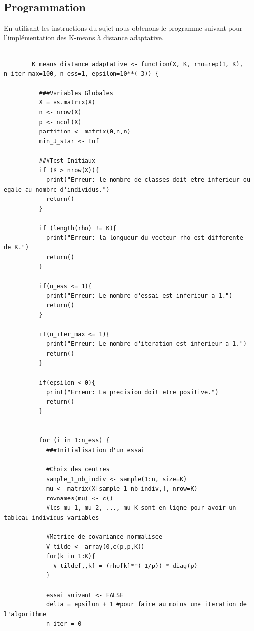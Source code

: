 \documentclass[a4paper,11pt,oneside,roman]{article}
\begin{document}
    \subsection{Programmation}
    En utilisant les instructions du sujet nous obtenons le programme suivant pour l'implémentation des K-means à distance adaptative.
    \begin{lstlisting}

        K_means_distance_adaptative <- function(X, K, rho=rep(1, K), n_iter_max=100, n_ess=1, epsilon=10**(-3)) {
          
          ###Variables Globales
          X = as.matrix(X)
          n <- nrow(X)
          p <- ncol(X)
          partition <- matrix(0,n,n)
          min_J_star <- Inf
          
          ###Test Initiaux
          if (K > nrow(X)){
            print("Erreur: le nombre de classes doit etre inferieur ou egale au nombre d'individus.")
            return()
          }
        
          if (length(rho) != K){
            print("Erreur: la longueur du vecteur rho est differente de K.")
            return()
          }
          
          if(n_ess <= 1){
            print("Erreur: Le nombre d'essai est inferieur a 1.")
            return()
          }
          
          if(n_iter_max <= 1){
            print("Erreur: Le nombre d'iteration est inferieur a 1.")
            return()
          }
          
          if(epsilon < 0){
            print("Erreur: La precision doit etre positive.")
            return()
          }
          
          
          for (i in 1:n_ess) {
            ###Initialisation d'un essai
            
            #Choix des centres
            sample_1_nb_indiv <- sample(1:n, size=K)
            mu <- matrix(X[sample_1_nb_indiv,], nrow=K)
            rownames(mu) <- c()
            #les mu_1, mu_2, ..., mu_K sont en ligne pour avoir un tableau individus-variables
        
            #Matrice de covariance normalisee
            V_tilde <- array(0,c(p,p,K))
            for(k in 1:K){
              V_tilde[,,k] = (rho[k]**(-1/p)) * diag(p)
            }
            
            essai_suivant <- FALSE
            delta = epsilon + 1 #pour faire au moins une iteration de l'algorithme
            n_iter = 0
            

\end{lstlisting}
\end{document}
